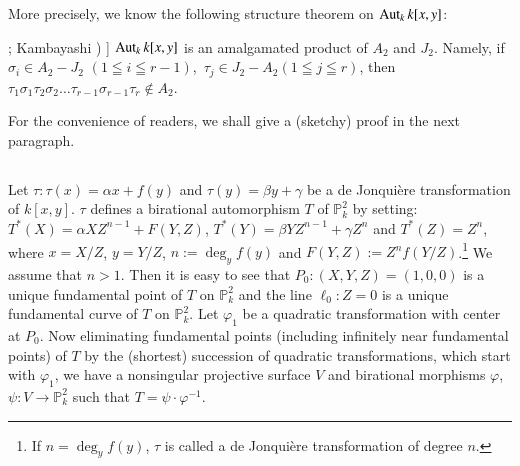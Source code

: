 \subsubsection{}\label{chap2:3.3.2}
More precisely, we know the following structure theorem on\break 
$\operatorname{Aut}_{k}k[x,y]$:

\begin{lemma*}[(\cf Nagata [43; Th.\@ 3.3]; Kambayashi \cite{25}) ]
  $\operatorname{Aut}_{k}k[x,y]$ is an amalgamated product of $A_{2}$ and
  $J_{2}$. Namely, if $\sigma_{i}\in A_{2}-J_{2}$ 
  \setcounter{pageoriginal}{130}
  $(1\leqq i\leqq r-1)$,\pageoriginale\ $\tau_{j}\in J_{2}-A_{2}(1\leqq
  j\leqq r)$, then
  $\tau_{1}\sigma_{1}\tau_{2}\sigma_{2}\ldots\tau_{r-1}\sigma_{r-1}\tau_{r}\not\in
  A_{2}$. 
\end{lemma*}

For the convenience of readers, we shall give a (sketchy) proof in the
next paragraph.

\subsection{}\label{chap2:3.4}
Let $\tau:\tau(x)=\alpha x+f(y)$ and $\tau(y)=\beta y+\gamma$ be a de
Jonqui\`ere transformation of $k[x,y]$. $\tau$ defines a birational
automorphism $T$ of $\mathbb{P}^{2}_{k}$ by setting:
$T^{\ast}(X)=\alpha XZ^{n-1}+F(Y,Z)$, $T^{\ast}(Y)=\beta
YZ^{n-1}+\gamma Z^{n}$ and $T^{\ast}(Z)=Z^{n}$, where $x=X/Z$,
$y=Y/Z$, $n:=\deg_{y}f(y)$ and $F(Y,Z):=Z^{n}f(Y/Z)$.\footnote{If
  $n=\deg_{y}f(y)$, $\tau$ is called a de Jonqui\`ere transformation
  of degree $n$.} We assume that $n>1$. Then it is easy to see that
$P_{0}:(X,Y,Z)=(1,0,0)$ is a unique fundamental point of $T$ on
$\mathbb{P}^{2}_{k}$ and the line $\ell_{0}:Z=0$ is a unique
fundamental curve of $T$ on $\mathbb{P}^{2}_{k}$. Let $\varphi_{1}$ be
a quadratic transformation with center at $P_{0}$. Now eliminating
fundamental points (including infinitely near fundamental points) of
$T$ by the (shortest) succession of quadratic transformations, which
start with $\varphi_{1}$, we have a nonsingular projective surface $V$
and birational morphisms $\varphi$, $\psi:V\to \mathbb{P}^{2}_{k}$
such that $T=\psi\cdot\varphi^{-1}$.

